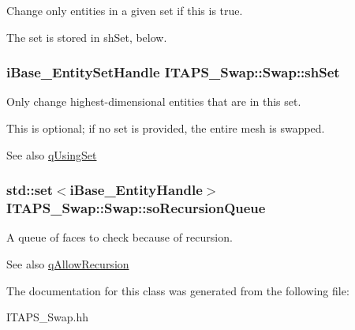 Change only entities in a given set if this is true. 

The set is stored in shSet, below. \hypertarget{class_i_t_a_p_s___swap_1_1_swap_ae9ab60da4630d1439edcd5401a4be85d}{
\subsubsection[{shSet}]{\setlength{\rightskip}{0pt plus 5cm}iBase\_\-EntitySetHandle {\bf ITAPS\_\-Swap::Swap::shSet}}}
\label{class_i_t_a_p_s___swap_1_1_swap_ae9ab60da4630d1439edcd5401a4be85d}


Only change highest-\/dimensional entities that are in this set. 

This is optional; if no set is provided, the entire mesh is swapped. \begin{DoxySeeAlso}{See also}
\hyperlink{class_i_t_a_p_s___swap_1_1_swap_ab6c9bfbc58fd9272e3706fa3ce4392c6}{qUsingSet} 
\end{DoxySeeAlso}
\hypertarget{class_i_t_a_p_s___swap_1_1_swap_ab49c1d524e26177afb0c0f76181304d7}{
\subsubsection[{soRecursionQueue}]{\setlength{\rightskip}{0pt plus 5cm}std::set$<$iBase\_\-EntityHandle$>$ {\bf ITAPS\_\-Swap::Swap::soRecursionQueue}}}
\label{class_i_t_a_p_s___swap_1_1_swap_ab49c1d524e26177afb0c0f76181304d7}


A queue of faces to check because of recursion. 

\begin{DoxySeeAlso}{See also}
\hyperlink{class_i_t_a_p_s___swap_1_1_swap_a400dea547bf0c4984d630e2b044a1316}{qAllowRecursion} 
\end{DoxySeeAlso}


The documentation for this class was generated from the following file:\begin{DoxyCompactItemize}
\item 
ITAPS\_\-Swap.hh\end{DoxyCompactItemize}
